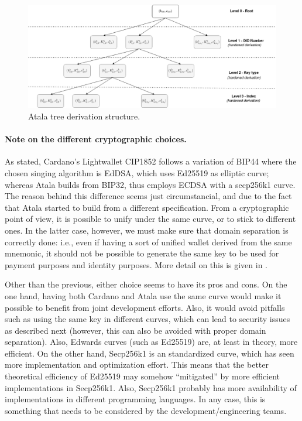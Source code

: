\begin{figure}[ht]
  \includegraphics[width=\textwidth]{figures/atala_tree.png}
  \caption{Atala tree derivation structure.}
  \label{fig:atalatree}
\end{figure}

\paragraph{Note on the different cryptographic choices.} As stated, Cardano's
Lightwallet CIP1852 follows a variation of BIP44 where the chosen singing
algorithm is EdDSA, which uses Ed25519 as elliptic curve; whereas Atala builds
from BIP32, thus employs ECDSA with a secp256k1 curve. The reason behind this
difference seems just circumstancial, and due to the fact that Atala started to
build from a different specification. From a cryptographic point of view, it is
possible to unify under the same curve, or to stick to different ones. In the
latter case, however, we must make sure that domain separation is correctly
done: i.e., even if having a sort of unified wallet derived from the same
mnemonic, it should not be possible to generate the same key to be used for
payment purposes and identity purposes. More detail on this is given in
.

Other than the previous, either choice seems to have its pros and cons. On the
one hand, having both Cardano and Atala use the same curve would make it
possible to benefit from joint development efforts. Also, it would avoid
pitfalls such as using the same key in different curves, which can lead to
security issues as described next (however, this can also be avoided with proper
domain separation). Also, Edwards curves (such as Ed25519) are, at least in
theory, more efficient. On the other hand, Secp256k1 is an standardized curve,
which has seen more implementation and optimization effort. This means that the
better theoretical efficiency of Ed25519 may somehow ``mitigated'' by more
efficient implementations in Secp256k1. Also, Secp256k1 probably has more
availability of implementations in different programming languages. In any case,
this is something that needs to be considered by the development/engineering
teams.

